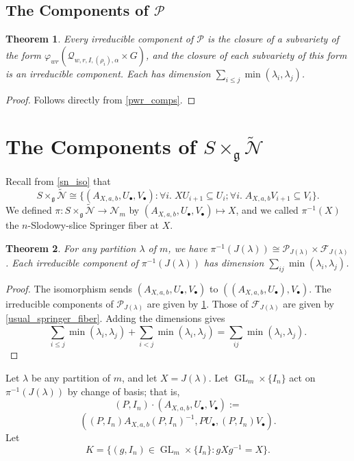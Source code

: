\documentclass[12pt,psamsfonts]{article}
\DeclareMathOperator{\GL}{GL}
\newtheorem{theorem}{Theorem}[section]
\begin{document}
\subsection{The Components of \texorpdfstring{\(\mathcal{P}\)}{P}}
\begin{theorem}\label{p_comps}
    Every irreducible component of \(\mathcal{P}\) is the closure of a subvariety of the form \(\varphi_{wr}(\mathcal{Q}_{w,r,I,(\rho_i),\alpha} \times G)\), and the closure of each subvariety of this form is an irreducible component.
    Each has dimension \(\sum_{i \leq j} \min(\lambda_i, \lambda_j)\).
\end{theorem}
\begin{proof}
    Follows directly from \cref{pwr_comps}.
\end{proof}

\section{The Components of \texorpdfstring{\(S \times_\mathfrak{g} \widetilde{\mathcal{N}}\)}{S x\_g N}}\label{sxn_comps}
Recall from \cref{sn_iso} that 
\[S \times_\mathfrak{g} \widetilde{\mathcal{N}} \cong \{(A_{X,a,b}, U_\bullet, V_\bullet) : \forall i. \; XU_{i + 1} \subseteq U_i; \forall i. \; A_{X,a,b} V_{i + 1} \subseteq V_i\}.\]
We defined \(\pi : S \times_\mathfrak{g} \widetilde{\mathcal{N}} \to \mathcal{N}_m\) by \((A_{X,a,b}, U_\bullet, V_\bullet) \mapsto X\), and we called \(\pi^{-1}(X)\) the \(n\)-Slodowy-slice Springer fiber at \(X\).
\begin{theorem}\label{springer_fiber_comps}
    For any partition \(\lambda\) of \(m\), we have \(\pi^{-1}(J(\lambda)) \cong \mathcal{P}_{J(\lambda)} \times \mathcal{F}_{J(\lambda)}\).
    Each irreducible component of \(\pi^{-1}(J(\lambda))\) has dimension \(\sum_{ij} \min(\lambda_i, \lambda_j)\).
\end{theorem}
\begin{proof}
    The isomorphism sends \((A_{X,a,b}, U_\bullet, V_\bullet)\) to \(((A_{X, a, b}, U_\bullet), V_\bullet)\).
    The irreducible components of \(\mathcal{P}_{J(\lambda)}\) are given by \cref{p_comps}.
    Those of \(\mathcal{F}_{J(\lambda)}\) are given by \cref{usual_springer_fiber}.
    Adding the dimensions gives 
    \[\sum_{i \leq j} \min(\lambda_i, \lambda_j) + \sum_{i < j} \min(\lambda_i, \lambda_j) = \sum_{ij} \min(\lambda_i, \lambda_j).\]
\end{proof}

Let \(\lambda\) be any partition of \(m\), and let \(X = J(\lambda)\).
Let \(\GL_m \times \{I_n\}\) act on \(\pi^{-1}(J(\lambda))\) by change of basis; that is,
\[(P, I_n) \cdot (A_{X, a, b}, U_\bullet, V_\bullet) := \]
\[((P,I_n)A_{X,a,b}(P,I_n)^{-1},PU_\bullet, (P,I_n)V_\bullet).\]
Let 
\[K = \{(g, I_n) \in \GL_m \times \{I_n\} : gXg^{-1} = X\}.\]
\end{document}
